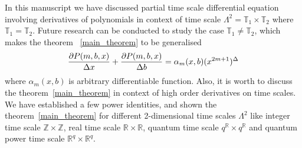 In this manuscript we have discussed partial time scale differential equation involving derivatives of polynomials
in context of time scale $\Lambda^2 = \mathbb{T}_1 \times \mathbb{T}_2$ where $\mathbb{T}_1 = \mathbb{T}_2$.
Future research can be conducted to study the case $\mathbb{T}_1 \neq \mathbb{T}_2$,
which makes the theorem ~\ref{main_theorem} to be generalised
\[
    \frac{\partial P ( m, b, x )}{\Delta x} +
    \frac{\partial P ( m, b, x )}{\Delta b}
    = \alpha_m(x,b) (x^{2m+1})^{\Delta}
\]
where $\alpha_m(x,b)$ is arbitrary differentiable function.
Also, it is worth to discuss the theorem~\ref{main_theorem} in context of high order derivatives on time scales.
We have established a few power identities, and shown the theorem~\ref{main_theorem} for different 2-dimensional
time scales $\Lambda^2$ like integer time scale $\mathbb{Z} \times \mathbb{Z}$, real time scale $\mathbb{R} \times \mathbb{R}$,
quantum time scale $q^{\mathbb{R}} \times q^{\mathbb{R}}$ and quantum power time scale $\mathbb{R}^q \times \mathbb{R}^q$.
